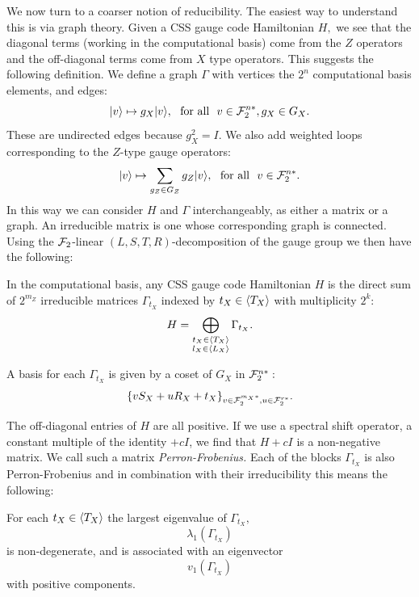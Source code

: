 We now turn to a coarser notion of reducibility.
The easiest way to understand this is via graph theory.
Given a CSS gauge code Hamiltonian $H,$ 
we see that 
the diagonal terms (working in the computational basis)
come from the $Z$ operators and the off-diagonal terms
come from $X$ type operators.
This suggests the following definition.
We define a graph $\Gamma$ with vertices the $2^n$ computational
basis elements, and edges:
$$
    |{v}\rangle \mapsto g_X |{v}\rangle, \ \ \mbox{for all}\ \  v\in\mathcal{F}_2^{n*}, g_X\in G_X.
$$
These are undirected edges because $g_X^2 = I.$
We also add weighted loops corresponding to the $Z$-type gauge operators:
$$
    |{v}\rangle \mapsto \sum_{g_Z\in G_Z} g_Z |{v}\rangle, \ \ \mbox{for all}\ \  v\in\mathcal{F}_2^{n*}.
$$
In this way we can consider $H$ and $\Gamma$ interchangeably,
as either a matrix or a graph.
An irreducible matrix is one whose corresponding graph is connected.
Using the $\mathcal{F}_2$-linear $(L,S,T,R)$-decomposition of the gauge group
we then have the following:
\begin{framed}
\noindent In the computational basis, any CSS gauge code
Hamiltonian $H$ is the direct sum of $2^{m_Z}$
irreducible matrices $\Gamma_{t_X}$
indexed by $t_X\in\langle T_X \rangle$
with multiplicity $2^k$:
$$
    H = \bigoplus_{
    \substack{t_X\in\langle T_X \rangle\\l_X\in\langle L_X \rangle}}
        \Gamma_{t_X}.
$$
\end{framed}
A basis for each $\Gamma_{t_X}$ is given by a coset
of $G_X$ in $\mathcal{F}_2^{n*}:$
$$
    \{ v S_X + u R_X + t_X \}_{v\in \mathcal{F}_2^{m_X*}, u\in\mathcal{F}_2^{r*}}.
$$


The off-diagonal entries of $H$ are all positive.
If we use a spectral shift operator, a constant multiple of the identity $+cI$,
we find that $H+cI$ is a non-negative matrix. 
We call such a matrix \emph{Perron-Frobenius.}
Each of the blocks $\Gamma_{t_X}$ is also Perron-Frobenius
and in combination with their irreducibility this means the following:
\begin{framed}
\noindent For each $t_X\in\langle T_X \rangle$
the largest eigenvalue 
of $\Gamma_{t_X},$
$$\lambda_1(\Gamma_{t_X})
$$
is non-degenerate,
and is associated with an eigenvector 
$$v_1(\Gamma_{t_X})
$$
with positive components.
\end{framed}

